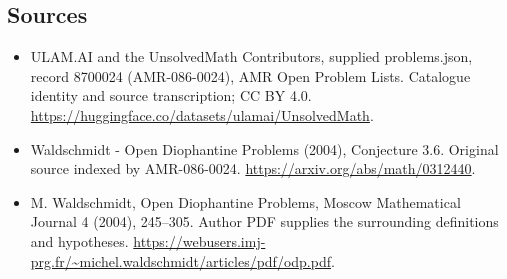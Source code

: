 \documentclass[11pt,a4paper]{article}
\begin{document}
\subsection{Sources}
\begin{itemize}
\item[S1] ULAM.AI and the UnsolvedMath Contributors, supplied problems.json, record 8700024 (AMR-086-0024), AMR Open Problem Lists. Catalogue identity and source transcription; CC BY 4.0.
\url{https://huggingface.co/datasets/ulamai/UnsolvedMath}.
\item[S2] Waldschmidt - Open Diophantine Problems (2004), Conjecture 3.6. Original source indexed by AMR-086-0024.
\url{https://arxiv.org/abs/math/0312440}.
\item[S3] M. Waldschmidt, Open Diophantine Problems, Moscow Mathematical Journal 4 (2004), 245–305. Author PDF supplies the surrounding definitions and hypotheses.
\url{https://webusers.imj-prg.fr/~michel.waldschmidt/articles/pdf/odp.pdf}.
\end{itemize}
\end{document}
